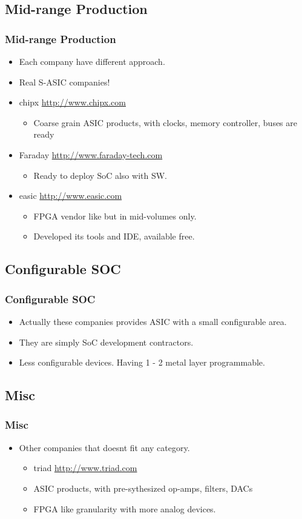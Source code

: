 \documentclass{beamer}
\begin{document}
\subsection{Mid-range Production}
\frame
{
  \frametitle{Mid-range Production}
  \begin{itemize}
  \item Each company have different approach.
  \item Real S-ASIC companies!
 
  \item chipx \url{http://www.chipx.com}
  \begin{itemize}
  \item Coarse grain ASIC products, with clocks, memory controller, buses are ready
  \end{itemize}

  \item Faraday \url{http://www.faraday-tech.com}
  \begin{itemize}
  \item Ready to deploy SoC also with SW.
  \end{itemize}

  \item easic \url{http://www.easic.com}
  \begin{itemize}
  \item FPGA vendor like but in mid-volumes only.
  \item Developed its tools and IDE, available free.
  \end{itemize}

  \end{itemize}
}

\subsection{Configurable SOC}
\frame
{
  \frametitle{Configurable SOC}
  \begin{itemize}
  \item Actually these companies provides ASIC with a small configurable area.
  \item They are simply SoC development contractors.
  \item Less configurable devices. Having 1 - 2 metal layer programmable.  
  \end{itemize}
}


\subsection{Misc}
\frame
{
  \frametitle{Misc}

  \begin{itemize}
  \item Other companies that doesnt fit any category.

  \begin{itemize}
  \item triad \url{http://www.triad.com}
  \item ASIC products, with pre-sythesized op-amps, filters, DACs
  \item FPGA like granularity with more analog devices.
  \end{itemize}
  \end{itemize}

}
\end{document}
